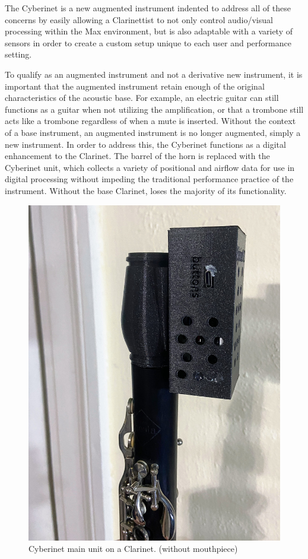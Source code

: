 The Cyberinet is a new augmented instrument indented to address all of these concerns by easily allowing a Clarinettist to not only control audio/visual processing within the Max environment, but is also adaptable with a variety of sensors in order to create a custom setup unique to each user and performance setting.

To qualify as an augmented instrument and not a derivative new instrument, it is important that the augmented instrument retain enough of the original characteristics of the acoustic base\cite{miranda_Wanderley_instrumentControl_2006}. For example, an electric guitar can still functions as a guitar when not utilizing the amplification, or that a trombone still acts like a trombone regardless of when a mute is inserted. Without the context of a base instrument, an augmented instrument is no longer augmented, simply a new instrument. In order to address this, the Cyberinet functions as a digital enhancement to the Clarinet. The barrel of the horn is replaced with the Cyberinet unit, which collects a variety of positional and airflow data for use in digital processing without impeding the traditional performance practice of the instrument. Without the base Clarinet, loses the majority of its functionality.

\begin{figure}
    \centering
    \includegraphics[scale=0.1]{diagrams/IMG_2212.JPG}
    \caption{Cyberinet main unit on a Clarinet. (without mouthpiece)}
    \label{fig:MainUnit}
\end{figure}

